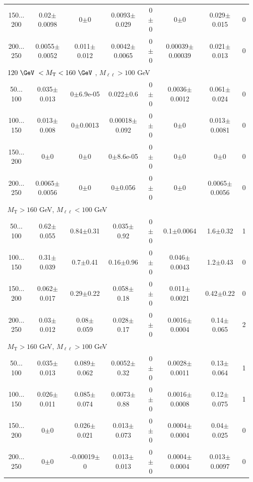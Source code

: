 \begin{landscape}
\begin{table}
\begin{center}
\begin{tabular}{| c | c c c c c c c | }
150$\dots$200&0.02$\pm$0.0098&0$\pm$0&0.0093$\pm$0.029&0$\pm$0&0$\pm$0&0.029$\pm$0.015&0\\
200$\dots$250&0.0055$\pm$0.0052&0.011$\pm$0.012&0.0042$\pm$0.0065&0$\pm$0&0.00039$\pm$0.00039&0.021$\pm$0.013&0\\
\hline\hline
\multicolumn{8}{l}{$120~\GeV~< M_{\text{T}} < 160~\GeV~$, $M_{\ell\ell} > 100$ GeV}\\\hline\hline
50$\dots$100&0.035$\pm$0.013&0$\pm$6.9e-05&0.022$\pm$0.6&0$\pm$0&0.0036$\pm$0.0012&0.061$\pm$0.024&0\\
100$\dots$150&0.013$\pm$0.008&0$\pm$0.0013&0.00018$\pm$0.092&0$\pm$0&0$\pm$0&0.013$\pm$0.0081&0\\
150$\dots$200&0$\pm$0&0$\pm$0&0$\pm$8.6e-05&0$\pm$0&0$\pm$0&0$\pm$0&0\\
200$\dots$250&0.0065$\pm$0.0056&0$\pm$0&0$\pm$0.056&0$\pm$0&0$\pm$0&0.0065$\pm$0.0056&0\\
\hline\hline
\multicolumn{8}{l}{$M_{\text{T}} > 160$ GeV, $M_{\ell\ell} < 100$ GeV}\\\hline\hline
50$\dots$100&0.62$\pm$0.055&0.84$\pm$0.31&0.035$\pm$0.92&0$\pm$0&0.1$\pm$0.0064&1.6$\pm$0.32&1\\
100$\dots$150&0.31$\pm$0.039&0.7$\pm$0.41&0.16$\pm$0.96&0$\pm$0&0.046$\pm$0.0043&1.2$\pm$0.43&0\\
150$\dots$200&0.062$\pm$0.017&0.29$\pm$0.22&0.058$\pm$0.18&0$\pm$0&0.011$\pm$0.0021&0.42$\pm$0.22&0\\
200$\dots$250&0.03$\pm$0.012&0.08$\pm$0.059&0.028$\pm$0.17&0$\pm$0&0.0016$\pm$0.0004&0.14$\pm$0.065&2\\
\hline\hline
\multicolumn{8}{l}{$M_{\text{T}} > 160$ GeV, $M_{\ell\ell} > 100$ GeV}\\\hline\hline
50$\dots$100&0.035$\pm$0.013&0.089$\pm$0.062&0.0052$\pm$0.32&0$\pm$0&0.0028$\pm$0.0011&0.13$\pm$0.064&1\\
100$\dots$150&0.026$\pm$0.011&0.085$\pm$0.074&0.0073$\pm$0.88&0$\pm$0&0.0016$\pm$0.0008&0.12$\pm$0.075&1\\
150$\dots$200&0$\pm$0&0.026$\pm$0.021&0.013$\pm$0.073&0$\pm$0&0.0004$\pm$0.0004&0.04$\pm$0.025&0\\
200$\dots$250&0$\pm$0&-0.00019$\pm$0&0.013$\pm$0.013&0$\pm$0&0.0004$\pm$0.0004&0.013$\pm$0.0097&0\\
\hline\hline
\end{tabular}
\end{center}
\end{table}

\end{landscape}
